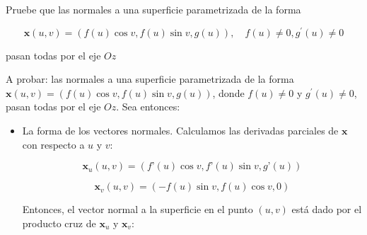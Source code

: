 \begin{problema}
    Pruebe que las normales a una superficie parametrizada de la forma

$$
\mathbf{x}(u, v)=(f(u) \cos v, f(u) \sin v, g(u)), \quad f(u) \neq 0, g^{\prime}(u) \neq 0
$$

pasan todas por el eje $O z$

\begin{dem}
    A probar: las normales a una superficie parametrizada de la forma $\mathbf{x}(u, v)=(f(u) \cos v, f(u) \sin v, g(u))$, donde $f(u) \neq 0$ y $g^{\prime}(u) \neq 0$, pasan todas por el eje $O z$. Sea entonces: 
    \begin{itemize}
        \item La forma de los vectores normales. Calculamos las derivadas parciales de $\mathbf{x}$ con respecto a $u$ y $v$:

        $$ \mathbf{x}_u(u,v) = (f’(u)\cos v,f’(u)\sin v,g’(u)) $$
        
        $$ \mathbf{x}_v(u,v) = (-f(u)\sin v,f(u)\cos v,0) $$
        
        Entonces, el vector normal a la superficie en el punto $(u,v)$ está dado por el producto cruz de $\mathbf{x}_u$ y $\mathbf{x}_v$:
        

\end{itemize}
\end{dem}
\end{problema}
